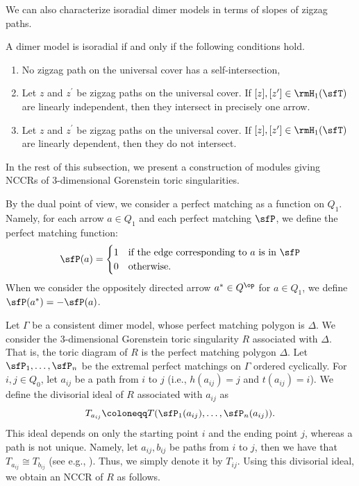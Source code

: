 We can also characterize isoradial dimer models in terms of slopes of zigzag paths.

\begin{prop}\label{slope_isoradial}
A dimer model is isoradial if and only if the following conditions hold.
\begin{enumerate}%
\item No zigzag path on the universal cover has a self-intersection,
\item Let $z$ and $z^\prime$ be zigzag paths on the universal cover. If $[z], [z^\prime]\in\rmH_1(\sfT)$ are linearly independent, then they intersect in precisely one arrow.
\item Let $z$ and $z^\prime$ be zigzag paths on the universal cover. If $[z], [z^\prime]\in\rmH_1(\sfT)$ are linearly dependent, then they do not intersect.
\end{enumerate}
\end{prop}


In the rest of this subsection, we present a construction of modules giving NCCRs of $3$-dimensional Gorenstein toric singularities.

By the dual point of view, we consider a perfect matching as a function on $Q_1$. Namely, for each arrow $a\in Q_1$ and each perfect matching $\sfP$, we define the perfect matching function:
\begin{equation}\label{pm_function}
\sfP(a)=%
\begin{cases}
1&\text{if the edge corresponding to $a$ is in $\sfP$}\\
0&\text{otherwise}. %
\end{cases} %
\end{equation}
When we consider the oppositely directed arrow $a^*\in Q^{\op}$ for $a\in Q_1$, we define $\sfP(a^*)=-\sfP(a)$.


Let $\Gamma$ be a consistent dimer model, whose perfect matching polygon is $\Delta$. We consider the $3$-dimensional Gorenstein toric singularity $R$ associated with $\Delta$. That is, the toric diagram of $R$ is the perfect matching polygon $\Delta$. Let $\sfP_1, \ldots, \sfP_n$ be the extremal perfect matchings on $\Gamma$ ordered cyclically. For $i, j\in Q_0$, let $a_{ij}$ be a path from $i$ to $j$ (i.e., $h(a_{ij})=j$ and $t(a_{ij})=i$). We define the divisorial ideal of $R$ associated with $a_{ij}$ as
\[
T_{a_{ij}}\coloneqq T(\sfP_1(a_{ij}), \ldots, \sfP_n(a_{ij})).
\]
This ideal depends on only the starting point $i$ and the ending point $j$, whereas a path is not unique. Namely, let $a_{ij}, b_{ij}$ be paths from $i$ to $j$, then we have that $T_{a_{ij}}\cong T_{b_{ij}}$ (see e.g., \cite[Lemma~3.7]{Nak}). Thus, we simply denote it by $T_{ij}$. Using this divisorial ideal, we obtain an NCCR of $R$ as follows.

